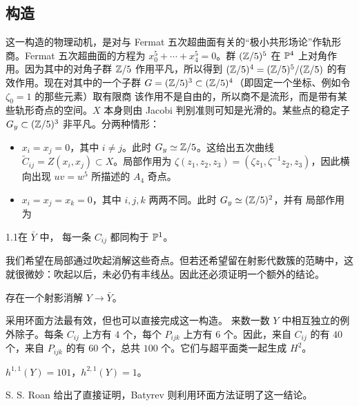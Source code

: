 \subsection{构造}
这一构造的物理动机，是对与 Fermat 五次超曲面有关的“极小共形场论”作轨形商。Fermat 五次超曲面的方程为 $x_0^5+\cdots+x_4^5=0$。群 $(\mathbb Z/5)^5$ 在 $\mathbb P^4$ 上对角作用。因为其中的对角子群 $\mathbb Z/5$ 作用平凡，所以得到 $(\mathbb Z/5)^4=(\mathbb Z/5)^5/(\mathbb Z/5)$ 的有效作用。现在对其中的一个子群 $G=(\mathbb Z/5)^3\subset(\mathbb Z/5)^4$（即固定一个坐标、例如令 $\zeta_0=1$ 的那些元素）取有限商
该作用不是自由的，所以商不是流形，而是带有某些轨形奇点的空间。$X$ 本身则由 Jacobi 判别准则可知是光滑的。某些点的稳定子 $G_y\subset(\mathbb Z/5)^3$ 非平凡。分两种情形：
\begin{itemize}
\item $x_i=x_j=0$，其中 $i\ne j$。此时 $G_y\simeq\mathbb Z/5$。这给出五次曲线 $\widetilde C_{ij}=Z(x_i,x_j)\subset X$。局部作用为
$\zeta(z_1,z_2,z_3)=(\zeta z_1,\zeta^{-1}z_2,z_3)$，因此横向出现 $uv=w^5$ 所描述的 $A_4$ 奇点。
\item $x_i=x_j=x_k=0$，其中 $i,j,k$ 两两不同。此时 $G_y\simeq(\mathbb Z/5)^2$，并有
局部作用为
\end{itemize}
\begin{Note}{1.1}在 $\bar Y$ 中，
每一条 $C_{ij}$ 都同构于 $\mathbb P^1$。
\end{Note}
我们希望在局部通过吹起消解这些奇点。但若还希望留在射影代数簇的范畴中，这就很微妙：吹起以后，未必仍有丰线丛。因此还必须证明一个额外的结论。
\begin{proposition}\label{pro:1.2}存在一个射影消解 $Y\to\bar Y$。\end{proposition}
采用环面方法最有效，但也可以直接完成这一构造。
来数一数 $Y$ 中相互独立的例外除子。每条 $C_{ij}$ 上方有 $4$ 个，每个 $P_{ijk}$ 上方有 $6$ 个。因此，来自 $C_{ij}$ 的有 $40$ 个，来自 $P_{ijk}$ 的有 $60$ 个，总共 $100$ 个。它们与超平面类一起生成 $H^2$。
\begin{proposition}\label{pro:1.3}$h^{1,1}(Y)=101$，$h^{2,1}(Y)=1$。\end{proposition}
S. S. Roan 给出了直接证明，Batyrev 则利用环面方法证明了这一结论。
